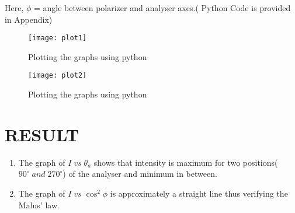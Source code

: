 \documentclass[11pt,a4paper]{article}
\begin{document}
Here, $\phi $ =  angle between polarizer and analyser axes.( Python Code is provided in Appendix)






\begin{figure}[thb]
\centering
\texttt{[image: plot1]}

\caption{Plotting the graphs using python}
\end{figure}


\begin{figure}[thb]
\centering
\texttt{[image: plot2]}

\caption{Plotting the graphs using python}
\end{figure}









\section*{RESULT}
\begin{enumerate}
\item The graph of $I \; vs \; \theta_{a}$ shows that intensity is maximum for two positions( $90^{\circ} \; and\; 270^{\circ}$) of the analyser and minimum in between.
\item The graph of $I \;vs\; \cos^{2}\phi$ is approximately a straight line thus verifying the Malus' law.  
\end{enumerate}
\end{document}
